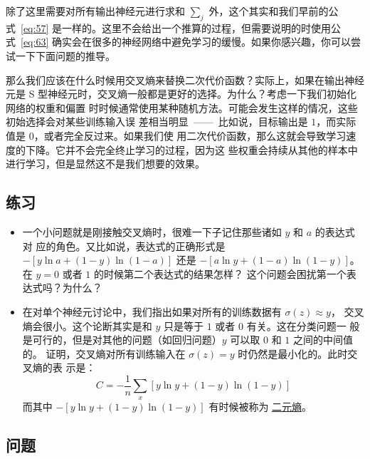 除了这里需要对所有输出神经元进行求和 $\sum_j$ 外，这个其实和我们早前的公
式~\eqref{eq:57} 是一样的。这里不会给出一个推算的过程，但需要说明的时使用公
式~\eqref{eq:63} 确实会在很多的神经网络中避免学习的缓慢。如果你感兴趣，你可以尝
试一下下面问题的推导。

那么我们应该在什么时候用交叉熵来替换二次代价函数？实际上，如果在输出神经元是 S
型神经元时，交叉熵一般都是更好的选择。为什么？考虑一下我们初始化网络的权重和偏置
时时候通常使用某种随机方法。可能会发生这样的情况，这些初始选择会对某些训练输入误
差相当明显~——~比如说，目标输出是 $1$，而实际值是 $0$，或者完全反过来。如果我们使
用二次代价函数，那么这就会导致学习速度的下降。它并不会完全终止学习的过程，因为这
些权重会持续从其他的样本中进行学习，但是显然这不是我们想要的效果。

\subsection*{练习}

\begin{itemize}
\item 一个小问题就是刚接触交叉熵时，很难一下子记住那些诸如 $y$ 和 $a$ 的表达式对
  应的角色。又比如说，表达式的正确形式是 $-[y \ln a + (1-y) \ln (1-a)]$ 还是
  $-[a \ln y + (1-a) \ln (1-y)]$。在 $y=0$ 或者 $1$ 的时候第二个表达式的结果怎样？
  这个问题会困扰第一个表达式吗？为什么？
\item 在对单个神经元讨论中，我们指出如果对所有的训练数据有 $\sigma(z) \approx y$，
  交叉熵会很小。这个论断其实是和 $y$ 只是等于 $1$ 或者 $0$ 有关。这在分类问题一
  般是可行的，但是对其他的问题（如回归问题）$y$ 可以取 $0$ 和 $1$ 之间的中间值的。
  证明，交叉熵对所有训练输入在 $\sigma(z) = y$ 时仍然是最小化的。此时交叉熵的表
  示是：
  \begin{equation}
    C = -\frac{1}{n} \sum_x [y \ln y+(1-y) \ln(1-y)]
    \label{eq:64}\tag{64}
  \end{equation}
  而其中 $-[y \ln y+(1-y)\ln(1-y)]$ 有时候被称为%
  \href{http://en.wikipedia.org/wiki/Binary_entropy_function}{二元熵}。
\end{itemize}

\subsection*{问题}

